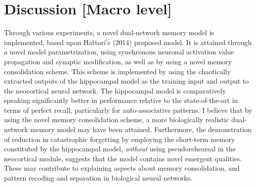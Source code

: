 
\chapter{Discussion [Macro level]}\label{chpt:discussion}


Through various experiments, a novel dual-network memory model is implemented, based upon Hattori's (2014) proposed model. It is attained through a novel model parametrization, using synchronous neuronal activation value propagation and synaptic modification, as well as by using a novel memory consolidation scheme. This scheme is implemented by using the chaotically extracted outputs of the hippocampal model as the training input and output to the neocortical neural network. The hippocampal model is comparatively speaking significantly better in performance relative to the state-of-the-art in terms of perfect recall, particularly for auto-associative patterns. I believe that by using the novel memory consolidation scheme, a more biologically realistic dual-network memory model may have been attained. Furthermore, the demonstration of reduction in catastrophic forgetting by employing the short-term memory constituted by the hippocampal model, \textit{without} using pseudorehearsal in the neocortical module, suggests that the model contains novel emergent qualities. These may contribute to explaining aspects about memory consolidation, and pattern recoding and separation in biological neural networks.
\\



